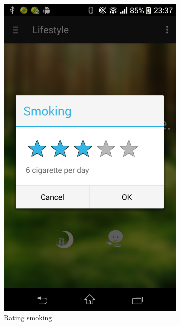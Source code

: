 \begin{figure}
\begin{subfigure}{.24\textwidth}
  \includegraphics[width=.8\linewidth]{img/screenshot/ss2.png}
  \caption{Rating smoking}
\end{subfigure}
\begin{subfigure}{.24\textwidth}
  \centering

\end{subfigure}
\end{figure}
